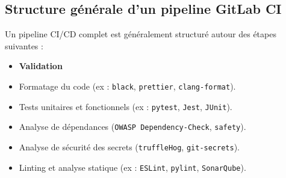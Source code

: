 \subsection{Structure générale d’un pipeline GitLab CI}

Un pipeline CI/CD complet est généralement structuré autour des étapes suivantes :

\begin{itemize}
	\item \textbf{Validation}
	\item Formatage du code (ex : \texttt{black}, \texttt{prettier}, \texttt{clang-format}).
	\item Tests unitaires et fonctionnels (ex : \texttt{pytest}, \texttt{Jest}, \texttt{JUnit}).
	\item Analyse de dépendances (\texttt{OWASP Dependency-Check}, \texttt{safety}).
	\item Analyse de sécurité des secrets (\texttt{truffleHog}, \texttt{git-secrets}).
	\item Linting et analyse statique (ex : \texttt{ESLint}, \texttt{pylint}, \texttt{SonarQube}).
\end{itemize}

